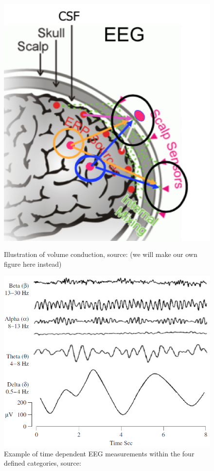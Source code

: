 \begin{figure}[H]
    \begin{minipage}[t]{.45\textwidth}
        \centering
        \includegraphics[width=\textwidth]{figurs/scalp.png}
        \caption{Illustration of volume conduction, source: \cite{phd2015}(we will make our own figure here instead)}\label{fig:volumeconduction}
    \end{minipage} 
    \hfill
    \begin{minipage}[t]{.45\textwidth}
        \centering
        \includegraphics[width=\textwidth]{figurs/EEG_example.png}
        \caption{Example of time dependent EEG measurements within the four defined categories, source: \cite{EEGsignalprocessing}}\label{fig:EEG_example}
    \end{minipage}
\end{figure}
